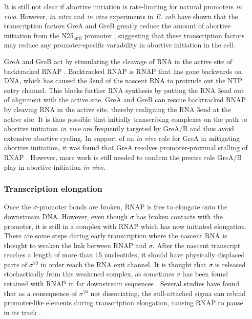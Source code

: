 It is still not clear if abortive initiation is rate-limiting for natural
promoters \textit{in vivo}. However, \textit{in vitro} and \textit{in vivo}
experiments in \textit{E. coli} have shown that the transcription factors GreA
and GreB greatly reduce the amount of abortive initiation from the
N25$_{\text{anti}}$ promoter \cite{hsu_escherichia_1995}, suggesting that these
transcription factors may reduce any promoter-specific variability in abortive
initiation in the cell.

GreA and GreB act by stimulating the cleavage of RNA in the active site of
backtracked RNAP \cite{toulme_grea_2000}. Backtracked RNAP is RNAP that has
gone backwards on DNA, which has caused the 3\p end of the nascent RNA to
protrude out the NTP entry channel. This blocks further RNA synthesis by
putting the RNA 3\p end out of alignment with the active site. GreA and GreB
can rescue backtracked RNAP by cleaving RNA in the active site, thereby
realigning the RNA 3\p end at the active site. It is thus possible that
initially transcribing complexes on the path to abortive initiation \textit{in
vivo} are frequently targeted by GreA/B and thus avoid extensive abortive
cycling. In support of an \textit{in vivo} role for GreA in mitigating abortive
initiation, it was found that GreA resolves promoter-proximal stalling of RNAP
\cite{kusuya_transcription_2011}. However, more work is still needed to confirm
the precise role GreA/B play in abortive initiation \textit{in vivo}.

\subsubsection{Transcription elongation}
Once the $\sigma$-promoter bonds are broken, RNAP is free to elongate onto the
downstream DNA. However, even though $\sigma$ has broken contacts with the
promoter, it is still in a complex with RNAP which has now initiated
elongation. There are some steps during early transcription where the nascent
RNA is thought to weaken the link between RNAP and $\sigma$. After the nascent
transcript reaches a length of more than 15 nucleotides, it should have
physically displaced parts of $\sigma^{70}$ \cite{mekler_structural_2002,
nickels_interaction_2005} in order reach the RNA exit channel. It is thought
that $\sigma$ is released stochastically from this weakened complex, as
sometimes $\sigma$ has been found retained with RNAP in far downstream sequences
\cite{mooney_sigma_2005}. Several studies have found that as a consequence of
$\sigma^{70}$ not dissociating, the still-attached sigma can rebind
promoter-like elements during transcription elongation, causing RNAP to pause
in its track \cite{ring_function_1996, kapanidis_retention_2005,
raffaelle_holoenzyme_2005}.

